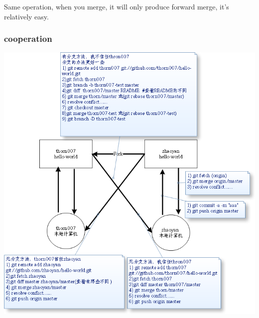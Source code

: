 \documentclass[a4paper,11pt,twoside]{book}
\begin{document}
Same operation, when you merge, it will only produce forward merge, it's relatively easy.

\subsubsection{cooperation}
\includegraphics[scale=0.8]{pics/git-corp} \\

\end{document}
